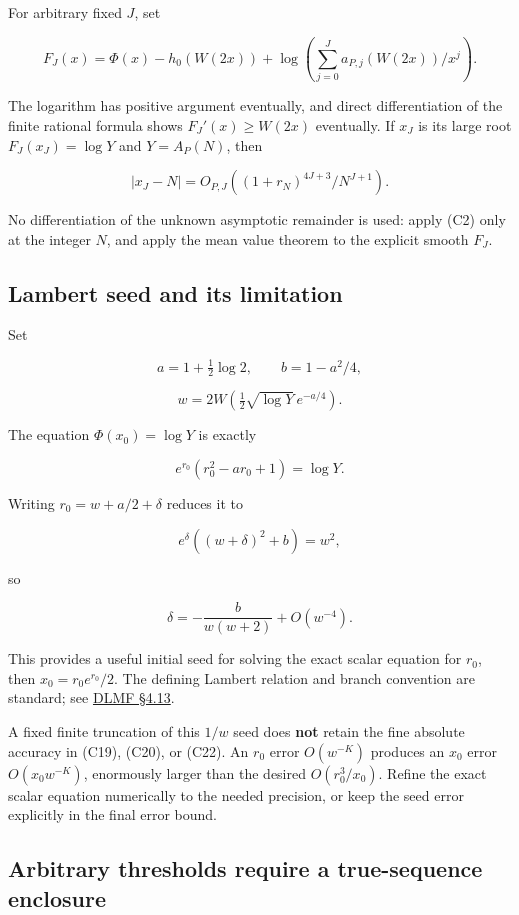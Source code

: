 For arbitrary fixed \(J\), set

\[
 F_J(x)=\Phi(x)-h_0(W(2x))
 +\log\left(\sum_{j=0}^J a_{P,j}(W(2x))/x^j\right).
 \tag{C21}\label{tcl:eq:C21}
\]

The logarithm has positive argument eventually, and direct
differentiation of the finite rational formula shows
\(F_J'(x)\ge W(2x)\) eventually. If \(x_J\) is its large root
\(F_J(x_J)=\log Y\) and \(Y=A_P(N)\), then

\[
 |x_J-N|=O_{P,J}\!\left((1+r_N)^{4J+3}/N^{J+1}\right).
 \tag{C22}\label{tcl:eq:C22}
\]

No differentiation of the unknown asymptotic remainder is used: apply
(C2) only at the integer \(N\), and apply the mean value theorem to the
explicit smooth \(F_J\).

\subsection{Lambert seed and its
limitation}\label{tcl:lambert-seed-and-its-limitation}

Set

\[
 a=1+\tfrac12\log2,\qquad b=1-a^2/4,
\]

\[
 w=2W\!\left(\tfrac12\sqrt{\log Y}\,e^{-a/4}\right).
\]

The equation \(\Phi(x_0)=\log Y\) is exactly

\[
 e^{r_0}(r_0^2-ar_0+1)=\log Y.
\]

Writing \(r_0=w+a/2+\delta\) reduces it to

\[
 e^\delta((w+\delta)^2+b)=w^2,
\]

so

\[
 \delta=-\frac{b}{w(w+2)}+O(w^{-4}).
 \tag{C23}\label{tcl:eq:C23}
\]

This provides a useful initial seed for solving the exact scalar
equation for \(r_0\), then \(x_0=r_0e^{r_0}/2\). The defining Lambert
relation and branch convention are standard; see
\href{https://dlmf.nist.gov/4.13}{DLMF §4.13}.

A fixed finite truncation of this \(1/w\) seed does \textbf{not} retain
the fine absolute accuracy in (C19), (C20), or (C22). An \(r_0\) error
\(O(w^{-K})\) produces an \(x_0\) error \(O(x_0w^{-K})\), enormously
larger than the desired \(O(r_0^3/x_0)\). Refine the exact scalar
equation numerically to the needed precision, or keep the seed error
explicitly in the final error bound.

\subsection{Arbitrary thresholds require a true-sequence
enclosure}\label{tcl:arbitrary-thresholds-require-a-true-sequence-enclosure}

